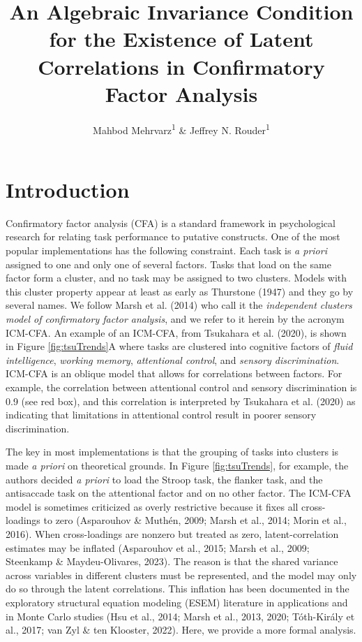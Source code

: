 \documentclass[
  american,
  man,floatsintext]{apa7}
\title{An Algebraic Invariance Condition for the Existence of Latent Correlations in Confirmatory Factor Analysis}
\author{Mahbod Mehrvarz\textsuperscript{1} \& Jeffrey N. Rouder\textsuperscript{1}}
\date{}
\affiliation{\vspace{0.5cm}\textsuperscript{1} University of California, Irvine}
\begin{document}
\maketitle

\section{Introduction}\label{introduction}

Confirmatory factor analysis (CFA) is a standard framework in psychological research for relating task performance to putative constructs. One of the most popular implementations has the following constraint. Each task is \emph{a priori} assigned to one and only one of several factors. Tasks that load on the same factor form a cluster, and no task may be assigned to two clusters. Models with this cluster property appear at least as early as Thurstone (1947) and they go by several names. We follow Marsh et al. (2014) who call it the \emph{independent clusters model of confirmatory factor analysis}, and we refer to it herein by the acronym ICM-CFA. An example of an ICM-CFA, from Tsukahara et al. (2020), is shown in Figure \ref{fig:tsuTrends}A where tasks are clustered into cognitive factors of \emph{fluid intelligence}, \emph{working memory}, \emph{attentional control}, and \emph{sensory discrimination}. ICM-CFA is an oblique model that allows for correlations between factors. For example, the correlation between attentional control and sensory discrimination is 0.9 (see red box), and this correlation is interpreted by Tsukahara et al. (2020) as indicating that limitations in attentional control result in poorer sensory discrimination.

The key in most implementations is that the grouping of tasks into clusters is made \emph{a priori} on theoretical grounds. In Figure \ref{fig:tsuTrends}, for example, the authors decided \emph{a priori} to load the Stroop task, the flanker task, and the antisaccade task on the attentional factor and on no other factor. The ICM-CFA model is sometimes criticized as overly restrictive because it fixes all cross-loadings to zero (Asparouhov \& Muthén, 2009; Marsh et al., 2014; Morin et al., 2016). When cross-loadings are nonzero but treated as zero, latent-correlation estimates may be inflated (Asparouhov et al., 2015; Marsh et al., 2009; Steenkamp \& Maydeu-Olivares, 2023). The reason is that the shared variance across variables in different clusters must be represented, and the model may only do so through the latent correlations. This inflation has been documented in the exploratory structural equation modeling (ESEM) literature in applications and in Monte Carlo studies (Hsu et al., 2014; Marsh et al., 2013, 2020; Tóth-Király et al., 2017; van Zyl \& ten Klooster, 2022). Here, we provide a more formal analysis.
\end{document}
